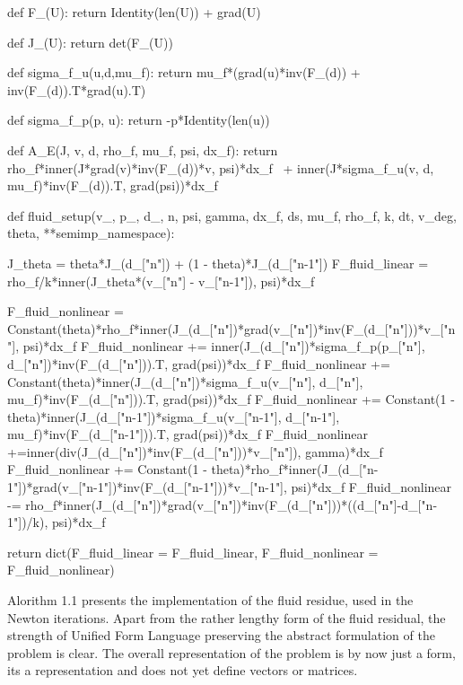 \begin{python}[caption=thetaCN.py]
def F_(U):
	return Identity(len(U)) + grad(U)

def J_(U):
	return det(F_(U))

def sigma_f_u(u,d,mu_f):
    return  mu_f*(grad(u)*inv(F_(d)) + inv(F_(d)).T*grad(u).T)

def sigma_f_p(p, u):
    return -p*Identity(len(u))

def A_E(J, v, d, rho_f, mu_f, psi, dx_f):
    return rho_f*inner(J*grad(v)*inv(F_(d))*v, psi)*dx_f \
        + inner(J*sigma_f_u(v, d, mu_f)*inv(F_(d)).T, grad(psi))*dx_f


def fluid_setup(v_, p_, d_, n, psi, gamma, dx_f, ds, mu_f, rho_f, k, dt, v_deg, theta, **semimp_namespace):

	J_theta = theta*J_(d_["n"]) + (1 - theta)*J_(d_["n-1"])
	F_fluid_linear = rho_f/k*inner(J_theta*(v_["n"] - v_["n-1"]), psi)*dx_f

	F_fluid_nonlinear =  Constant(theta)*rho_f*inner(J_(d_["n"])*grad(v_["n"])*inv(F_(d_["n"]))*v_["n"], psi)*dx_f
	F_fluid_nonlinear += inner(J_(d_["n"])*sigma_f_p(p_["n"], d_["n"])*inv(F_(d_["n"])).T, grad(psi))*dx_f
	F_fluid_nonlinear += Constant(theta)*inner(J_(d_["n"])*sigma_f_u(v_["n"], d_["n"], mu_f)*inv(F_(d_["n"])).T, grad(psi))*dx_f
	F_fluid_nonlinear += Constant(1 - theta)*inner(J_(d_["n-1"])*sigma_f_u(v_["n-1"], d_["n-1"], mu_f)*inv(F_(d_["n-1"])).T, grad(psi))*dx_f
	F_fluid_nonlinear +=inner(div(J_(d_["n"])*inv(F_(d_["n"]))*v_["n"]), gamma)*dx_f
	F_fluid_nonlinear += Constant(1 - theta)*rho_f*inner(J_(d_["n-1"])*grad(v_["n-1"])*inv(F_(d_["n-1"]))*v_["n-1"], psi)*dx_f
	F_fluid_nonlinear -= rho_f*inner(J_(d_["n"])*grad(v_["n"])*inv(F_(d_["n"]))*((d_["n"]-d_["n-1"])/k), psi)*dx_f

	return dict(F_fluid_linear = F_fluid_linear, F_fluid_nonlinear = F_fluid_nonlinear)
\end{python}

Alorithm 1.1 presents the implementation of the fluid residue, used in the Newton iterations. Apart from the rather lengthy form of the fluid residual, the strength of Unified Form Language preserving the abstract formulation of the problem is clear. The overall representation of the problem is by now just a form, its a representation and does not yet define vectors or matrices.

